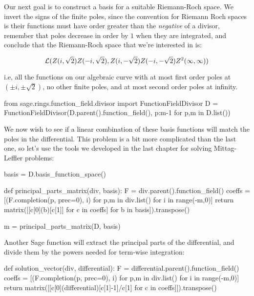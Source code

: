 Our next goal is to construct a basis for a suitable Riemann-Roch space.
We invert the signs of the finite poles,
since the convention for Riemann Roch spaces is their functions must
have order greater than the {\it negative} of a divisor, remember
that poles decrease in order by $1$ when they are integrated,
and conclude that the Riemann-Roch space that we're interested in is:

$${\cal L}(Z(i, \sqrt{2}) Z(-i, \sqrt{2}), Z(i, -\sqrt{2}) Z(-i, -\sqrt{2}) Z^2(\infty,\infty))$$

i.e, all the functions on our algebraic curve with at most first order
poles at $(\pm i,\pm\sqrt{2})$, no other finite poles, and at most
second order poles at infinity.

\begin{sageblock}[riemannroch3]
from sage.rings.function_field.divisor import FunctionFieldDivisor
D = FunctionFieldDivisor(D.parent().function_field(), {p:m-1 for p,m in D.list()})
\end{sageblock}

We now wish to see if a linear combination of these basis functions will
match the poles in the differential.  This problem is a bit more complicated
than the last one, so let's use the tools we developed in the
last chapter for solving Mittag-Leffler problems:

\begin{sageblock}[riemannroch3]
basis = D.basis_function_space()
\end{sageblock}

\begin{sageblock}[riemannroch3]
def principal_parts_matrix(div, basis):
    F = div.parent().function_field()
    coeffs = [(F.completion(p, prec=0), i) for p,m in div.list() for i in range(-m,0)]
    return matrix([[c[0](b)[c[1]] for c in coeffs] for b in basis]).transpose()
\end{sageblock}

\begin{sageblock}[riemannroch3]
m = principal_parts_matrix(D, basis)
\end{sageblock}

Another Sage function will extract the principal parts of the
differential, and divide them by the powers needed for term-wise
integration:

\begin{sageblock}[riemannroch3]
def solution_vector(div, differential):
    F = differential.parent().function_field()
    coeffs = [(F.completion(p, prec=0), i) for p,m in div.list() for i in range(-m,0)]
    return matrix([[c[0](differential)[c[1]-1]/c[1] for c in coeffs]]).transpose()
\end{sageblock}

